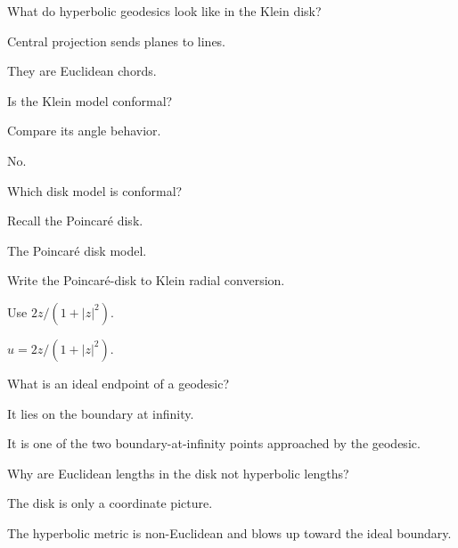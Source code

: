 \begin{exercise}\label{exr:vii31-18}
What do hyperbolic geodesics look like in the Klein disk?
\end{exercise}
\begin{hint}
Central projection sends planes to lines.
\end{hint}
\begin{solution}
They are Euclidean chords.
\end{solution}

\begin{exercise}\label{exr:vii31-19}
Is the Klein model conformal?
\end{exercise}
\begin{hint}
Compare its angle behavior.
\end{hint}
\begin{solution}
No.
\end{solution}

\begin{exercise}\label{exr:vii31-20}
Which disk model is conformal?
\end{exercise}
\begin{hint}
Recall the Poincaré disk.
\end{hint}
\begin{solution}
The Poincaré disk model.
\end{solution}

\begin{exercise}\label{exr:vii31-21}
Write the Poincaré-disk to Klein radial conversion.
\end{exercise}
\begin{hint}
Use \(2z/(1+|z|^2)\).
\end{hint}
\begin{solution}
\(u=2z/(1+|z|^2)\).
\end{solution}

\begin{exercise}\label{exr:vii31-22}
What is an ideal endpoint of a geodesic?
\end{exercise}
\begin{hint}
It lies on the boundary at infinity.
\end{hint}
\begin{solution}
It is one of the two boundary-at-infinity points approached by the geodesic.
\end{solution}

\begin{exercise}\label{exr:vii31-23}
Why are Euclidean lengths in the disk not hyperbolic lengths?
\end{exercise}
\begin{hint}
The disk is only a coordinate picture.
\end{hint}
\begin{solution}
The hyperbolic metric is non-Euclidean and blows up toward the ideal boundary.
\end{solution}

